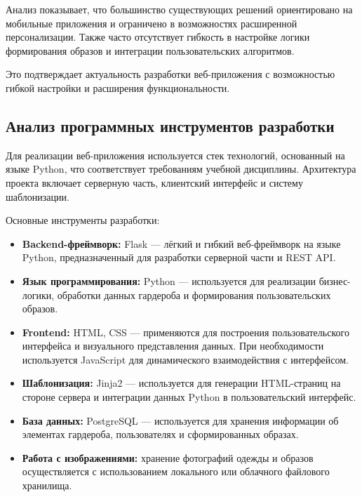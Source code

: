 Анализ показывает, что большинство существующих решений ориентировано на мобильные приложения и ограничено в возможностях расширенной персонализации. Также часто отсутствует гибкость в настройке логики формирования образов и интеграции пользовательских алгоритмов.

Это подтверждает актуальность разработки веб-приложения с возможностью гибкой настройки и расширения функциональности.

\subsection{Анализ программных инструментов разработки}

Для реализации веб-приложения используется стек технологий, основанный на языке Python, что соответствует требованиям учебной дисциплины. Архитектура проекта включает серверную часть, клиентский интерфейс и систему шаблонизации.

Основные инструменты разработки:

\begin{itemize}
	\item \textbf{Backend-фреймворк:} Flask — лёгкий и гибкий веб-фреймворк на языке Python, предназначенный для разработки серверной части и REST API.
	
	\item \textbf{Язык программирования:} Python — используется для реализации бизнес-логики, обработки данных гардероба и формирования пользовательских образов.
	
	\item \textbf{Frontend:} HTML, CSS — применяются для построения пользовательского интерфейса и визуального представления данных. При необходимости используется JavaScript для динамического взаимодействия с интерфейсом.
	
	\item \textbf{Шаблонизация:} Jinja2 — используется для генерации HTML-страниц на стороне сервера и интеграции данных Python в пользовательский интерфейс.
	
	\item \textbf{База данных:} PostgreSQL — используется для хранения информации об элементах гардероба, пользователях и сформированных образах.
	
	\item \textbf{Работа с изображениями:} хранение фотографий одежды и образов осуществляется с использованием локального или облачного файлового хранилища.
\end{itemize}

